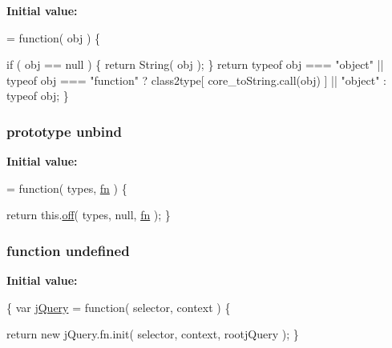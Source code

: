 {\bfseries Initial value\-:}
\begin{DoxyCode}
= \textcolor{keyword}{function}( obj ) \{


        \textcolor{keywordflow}{if} ( obj == null ) \{
            \textcolor{keywordflow}{return} String( obj );
        \}
        \textcolor{keywordflow}{return} typeof obj === \textcolor{stringliteral}{"object"} || typeof obj === \textcolor{stringliteral}{"function"} ?
            class2type[ core\_toString.call(obj) ] || \textcolor{stringliteral}{"object"} :
            typeof obj;
    \}
\end{DoxyCode}
\hypertarget{jquery-1_810_82-vsdoc_8js_af46ad9e68add9abd540e1b4f9da37b62}{
\subsubsection[{unbind}]{ {\bf prototype} unbind}}\label{jquery-1_810_82-vsdoc_8js_af46ad9e68add9abd540e1b4f9da37b62}
{\bfseries Initial value\-:}
\begin{DoxyCode}
= \textcolor{keyword}{function}( types, \hyperlink{jquery-1_810_82-vsdoc_8js_acef6bdaf6b9b20fdcca1ea86f0902c3b}{fn} ) \{


        \textcolor{keywordflow}{return} this.\hyperlink{jquery-1_810_82-vsdoc_8js_abd3345ae76b0b1425e11cd916e7bc97c}{off}( types, null, \hyperlink{jquery-1_810_82-vsdoc_8js_acef6bdaf6b9b20fdcca1ea86f0902c3b}{fn} );
    \}
\end{DoxyCode}
\hypertarget{jquery-1_810_82-vsdoc_8js_a08113a236cc18d2a9d5ce27e638012be}{
\subsubsection[{undefined}]{\setlength{\rightskip}{0pt plus 5cm}function undefined}}\label{jquery-1_810_82-vsdoc_8js_a08113a236cc18d2a9d5ce27e638012be}
{\bfseries Initial value\-:}
\begin{DoxyCode}
\{
var \hyperlink{jquery-1_810_82-vsdoc_8js_add5237586d970a38a81f990e8eb28c6c}{jQuery} = \textcolor{keyword}{function}( selector, context ) \{


        
        \textcolor{keywordflow}{return} \textcolor{keyword}{new} jQuery.fn.init( selector, context, rootjQuery );
    \}
\end{DoxyCode}
